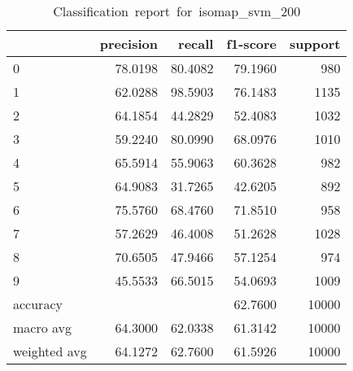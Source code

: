 \begin{table}[htb!]
    \centering
    \begin{tabular}{lrrrr}
        \toprule
                     & precision & recall  & f1-score & support \\
        \midrule
        0            & 78.0198   & 80.4082 & 79.1960  & 980     \\
        1            & 62.0288   & 98.5903 & 76.1483  & 1135    \\
        2            & 64.1854   & 44.2829 & 52.4083  & 1032    \\
        3            & 59.2240   & 80.0990 & 68.0976  & 1010    \\
        4            & 65.5914   & 55.9063 & 60.3628  & 982     \\
        5            & 64.9083   & 31.7265 & 42.6205  & 892     \\
        6            & 75.5760   & 68.4760 & 71.8510  & 958     \\
        7            & 57.2629   & 46.4008 & 51.2628  & 1028    \\
        8            & 70.6505   & 47.9466 & 57.1254  & 974     \\
        9            & 45.5533   & 66.5015 & 54.0693  & 1009    \\
        accuracy     &           &         & 62.7600   & 10000   \\
        macro avg    & 64.3000   & 62.0338 & 61.3142  & 10000   \\
        weighted avg & 64.1272   & 62.7600 & 61.5926  & 10000   \\
        \bottomrule
    \end{tabular}
    \caption{Classification\ report\ for\ isomap\_svm\_200}
    \label{tab:classification-report-isomap_svm_200}
\end{table}
